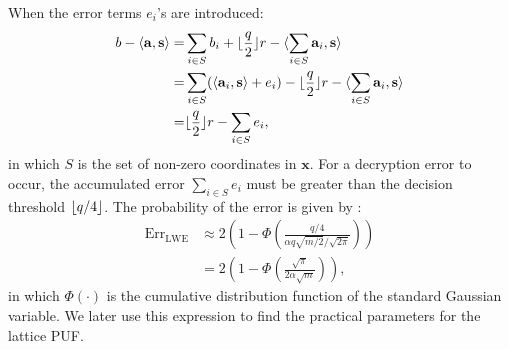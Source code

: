 When the error terms $e_i$'s are introduced:
\begin{align*}
b-\langle\mathbf{a},\mathbf{s}\rangle = &\sum_{i\in S}b_i + \lfloor\frac{q}{2}\rfloor r - \langle\sum_{i\in S}\mathbf{a}_i,\mathbf{s}\rangle\\
= &\sum_{i\in S}(\langle\mathbf{a}_i,\mathbf{s}\rangle+e_i) - \lfloor\frac{q}{2}\rfloor r - \langle\sum_{i\in S}\mathbf{a}_i,\mathbf{s}\rangle\\
= &\lfloor\frac{q}{2}\rfloor r - \sum_{i\in S}e_i,
\end{align*}
in which $S$ is the set of non-zero coordinates in $\mathbf{x}$.
For a decryption error to occur, the accumulated error $\sum_{i\in S}e_i$ must be greater than the decision threshold $\lfloor q/4\rfloor$. 
The probability of the error is given by \cite{micciancio2009lattice}: 
\begin{align*}
\text{Err}_{\text{LWE}} &\approx 2(1-\Phi(\frac{q/4}{\alpha q \sqrt{m/2}/\sqrt{2\pi}})) \\
&= 2(1-\Phi(\frac{\sqrt{\pi}}{2\alpha\sqrt{m}})),
\end{align*}
in which $\Phi(\cdot)$ is the cumulative distribution function of the standard Gaussian variable. 
We later use this expression to find the practical parameters for the lattice PUF.

